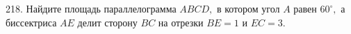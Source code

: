 218. Найдите площадь параллелограмма $ABCD,$ в котором угол $A$ равен $60^\circ,$ а биссектриса $AE$ делит сторону $BC$ на отрезки $BE=1$ и $EC=3.$\\
